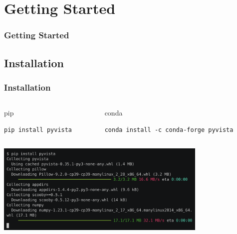 \documentclass[t]{beamer}
\begin{document}
\section{Getting Started}

\begin{frame}
  \frametitle{Getting Started}
  \tableofcontents[currentsection]
  \vspace{200pt}  %
\end{frame}

\subsection{Installation}
\begin{frame}[fragile=singleslide]
  \frametitle{Installation}
  \vspace{-10pt}

  \begin{columns}[T]
    \begin{column}{.5\textwidth}
      \vspace{-10pt}
      \begin{exampleblock}{pip}
        \begin{lstlisting}[basicstyle=\ttfamily\footnotesize]
pip install pyvista
        \end{lstlisting}
      \end{exampleblock}

    \end{column}

    \begin{column}{.5\textwidth}
      \vspace{-10pt}
      \begin{exampleblock}{conda}
        \begin{lstlisting}[basicstyle=\ttfamily\footnotesize]
conda install -c conda-forge pyvista
        \end{lstlisting}
      \end{exampleblock}

    \end{column}
  \end{columns}

  \vspace{5pt}

  \centering
  \href{https://asciinema.org/a/507562}{\includegraphics[width=0.76\textwidth]{figures/install_pyvista.png}}

\end{frame}
\end{document}

